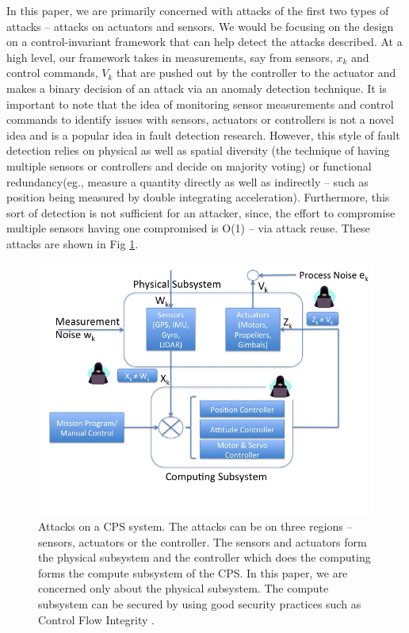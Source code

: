 In this paper, we are primarily concerned with attacks of the first two types of attacks -- attacks on actuators and sensors. We would be focusing on the design on a control-invariant framework that can help detect the attacks described. At a high level, our framework takes in measurements, say from sensors, $x_k$ and control commands, $V_k$  that are pushed out by the controller to the actuator and makes a binary decision of an attack via an anomaly detection technique. It is important to note that the idea of monitoring sensor measurements and control commands to identify issues with sensors, actuators or controllers is not a novel idea and is a popular idea in fault detection research. However, this style of fault detection relies on physical as well as spatial diversity (the technique of having multiple sensors or controllers and decide on majority voting) or functional redundancy(eg., measure a quantity directly as well as indirectly -- such as position being measured by double integrating acceleration). Furthermore, this sort of detection is not sufficient for an attacker, since, the effort to compromise multiple sensors having one compromised is O(1) -- via attack reuse. These attacks are shown in Fig \ref{fig:cps-attacks}. 

\begin{figure}
    \centering
    \includegraphics[scale=0.33]{images/cps-attacks.jpg}
    \caption{Attacks on a CPS system. The attacks can be on three regions -- sensors, actuators or the controller. The sensors and actuators form the physical subsystem and the controller which does the computing forms the compute subsystem of the CPS. In this paper, we are concerned only about the physical subsystem. The compute subsystem can be secured by using good security practices such as Control Flow Integrity \cite{abadi2005control}. }
    \label{fig:cps-attacks}
\end{figure}

